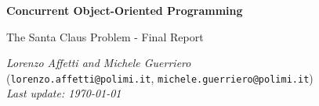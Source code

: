 \begin{titlepage}
\begin{center}
\Huge
\textbf{Concurrent Object-Oriented Programming}

The Santa Claus Problem - Final Report

\vspace{3cm}
\normalsize
\Large \textit{Lorenzo Affetti and Michele Guerriero}\\
\large (\texttt{lorenzo.affetti@polimi.it}, \texttt{michele.guerriero@polimi.it})\\
\textit{Last update: \today}
\end{center}
\end{titlepage}
